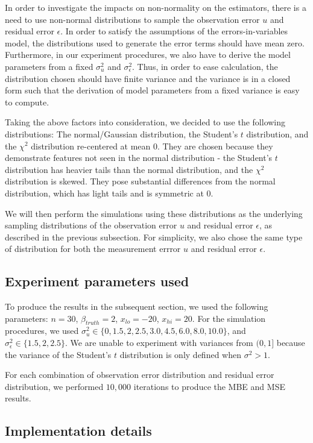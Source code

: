 \documentclass{article}
\begin{document}
In order to investigate the impacts on non-normality on the estimators, there is a need to use non-normal distributions to sample the observation error $u$ and residual error $\epsilon$.
In order to satisfy the assumptions of the errors-in-variables model, the distributions used to generate the error terms should have mean zero.
Furthermore, in our experiment procedures, we also have to derive the model parameters from a fixed $\sigma_u^2$ and $\sigma_\epsilon^2$.
Thus, in order to ease calculation, the distribution chosen should have finite variance and the variance is in a closed form such that the derivation of model parameters from a fixed variance is easy to compute.

Taking the above factors into consideration, we decided to use the following distributions: The normal/Gaussian distribution, the Student's $t$ distribution, and the $\chi^2$ distribution re-centered at mean $0$.
They are chosen because they demonstrate features not seen in the normal distribution - the Student's $t$ distribution has heavier tails than the normal distribution, and the $\chi^2$ distribution is skewed.
They pose substantial differences from the normal distribution, which has light tails and is symmetric at $0$.

We will then perform the simulations using these distributions as the underlying sampling distributions of the observation error $u$ and residual error $\epsilon$, as described in the previous subsection.
For simplicity, we also chose the same type of distribution for both the measurement errror $u$ and residual error $\epsilon$.

\subsection{Experiment parameters used}

To produce the results in the subsequent section, we used the following parameters: $n=30$, $\beta_{truth}=2$, $x_{lo} = -20$, $x_{hi} = 20$.
For the simulation procedures, we used $\sigma^2_u \in \{0, 1.5, 2, 2.5, 3.0, 4.5, 6.0, 8.0, 10.0\}$, and $\sigma_\epsilon^2 \in \{1.5, 2, 2.5\}$.
We are unable to experiment with variances from $(0, 1]$ because the variance of the Student's $t$ distribution is only defined when $\sigma^2 > 1$.

For each combination of observation error distribution and residual error distribution, we performed $10,000$ iterations to produce the MBE and MSE results.

\subsection{Implementation details}
\end{document}
